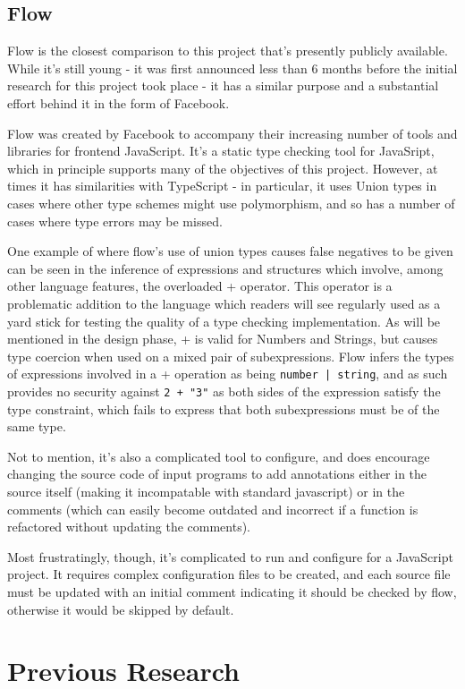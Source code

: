 \documentclass[british, twoside]{bhamthesis}
\theoremstyle{definition}
\begin{document}
  \subsection{Flow}
    Flow is the closest comparison to this project that's presently publicly available. While it's still young - it was first announced less than 6 months before the initial research for this project took place - it has a similar purpose and a substantial effort behind it in the form of Facebook.

    Flow was created by Facebook to accompany their increasing number of tools and libraries for frontend JavaScript. It's a static type checking tool for JavaSript, which in principle supports many of the objectives of this project. However, at times it has similarities with TypeScript - in particular, it uses Union types in cases where other type schemes might use polymorphism, and so has a number of cases where type errors may be missed.

    One example of where flow's use of union types causes false negatives to be given can be seen in the inference of expressions and structures which involve, among other language features, the overloaded + operator. This operator is a problematic addition to the language which readers will see regularly used as a yard stick for testing the quality of a type checking implementation. As will be mentioned in the design phase, + is valid for Numbers and Strings, but causes type coercion when used on a mixed pair of subexpressions. Flow infers the types of expressions involved in a + operation as being \texttt{number | string}, and as such provides no security against \texttt{2 + "3"} as both sides of the expression satisfy the type constraint, which fails to express that both subexpressions must be of the same type.

    Not to mention, it's also a complicated tool to configure, and does encourage changing the source code of input programs to add annotations either in the source itself (making it incompatable with standard javascript) or in the comments (which can easily become outdated and incorrect if a function is refactored without updating the comments).

    Most frustratingly, though, it's complicated to run and configure for a JavaScript project. It requires complex configuration files to be created, and each source file must be updated with an initial comment indicating it should be checked by flow, otherwise it would be skipped by default.

  \section{Previous Research}
\end{document}
